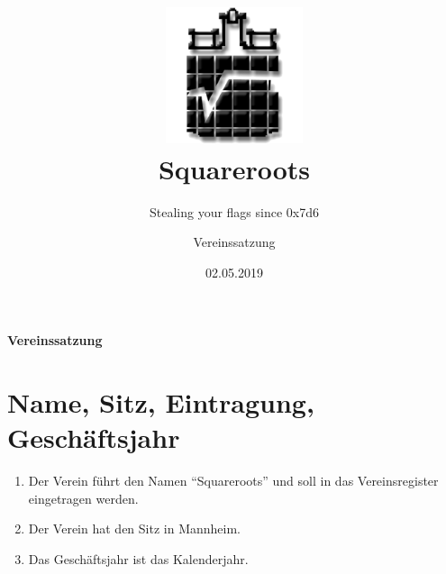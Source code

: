 \documentclass[a4paper,ngerman]{scrartcl}
\begin{document}
\title{\includegraphics[width=0.3\textwidth]{sqrts}\\[1cm]Squareroots}
\subtitle{Stealing your flags since 0x7d6}
\date{02.05.2019}
\author{Vereinssatzung}

\maketitle
\pagebreak

\setcounter{tocdepth}{1}
\listoftodos
\pagebreak


\textbf{\huge{}Vereinssatzung}{\huge \par}

\section{Name, Sitz, Eintragung, Geschäftsjahr}
\begin{enumerate}
\item Der Verein führt den Namen "`Squareroots"' und soll in das Vereinsregister eingetragen werden.
\item Der Verein hat den Sitz in Mannheim.
\item Das Geschäftsjahr ist das Kalenderjahr.
\end{enumerate}
\end{document}
